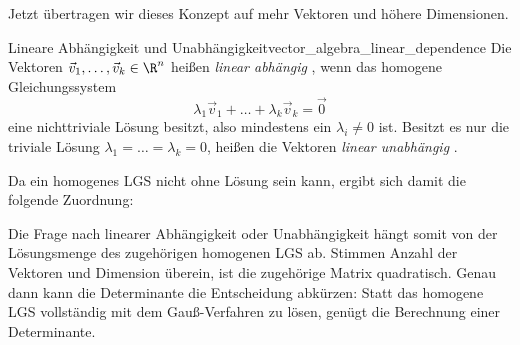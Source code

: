 Jetzt übertragen wir dieses Konzept auf mehr Vektoren und höhere Dimensionen.

\begin{DefinitionBox}{Lineare Abhängigkeit und Unabhängigkeit}{vector_algebra_linear_dependence}
  Die Vektoren $\vec v_1,\dots,\vec v_k\in\R^n$ heißen \emph{linear abhängig}
  , wenn das homogene Gleichungssystem
  \[
    \lambda_1\vec v_1+\dots+\lambda_k\vec v_k=\vec 0
  \]
  eine nichttriviale Lösung besitzt, also mindestens ein
  $\lambda_i\ne0$ ist. Besitzt es nur die triviale Lösung
  $\lambda_1=\dots=\lambda_k=0$, heißen die Vektoren \emph{linear unabhängig}
  .

  Da ein homogenes LGS nicht ohne Lösung sein kann, ergibt sich damit die
  folgende Zuordnung:
  \begin{center}
  \end{center}
\end{DefinitionBox}

\noindent
\begin{minipage}{\linewidth}
Die Frage nach linearer Abhängigkeit oder Unabhängigkeit hängt somit von
der Lösungsmenge des zugehörigen homogenen LGS ab. Stimmen Anzahl der Vektoren
und Dimension überein, ist die zugehörige Matrix quadratisch. Genau dann kann
die Determinante die Entscheidung abkürzen: Statt das homogene LGS vollständig
mit dem Gauß-Verfahren zu lösen, genügt die Berechnung einer Determinante.
\end{minipage}


